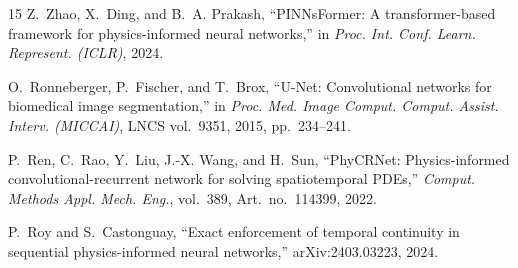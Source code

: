 \documentclass[conference]{IEEEtran}
\begin{document}
\begin{thebibliography}{15}
Z.~Zhao, X.~Ding, and B.~A. Prakash, ``PINNsFormer: A transformer-based
framework for physics-informed neural networks,'' in \emph{Proc. Int. Conf.
Learn. Represent. (ICLR)}, 2024.

O.~Ronneberger, P.~Fischer, and T.~Brox, ``U-Net: Convolutional networks for
biomedical image segmentation,'' in \emph{Proc. Med. Image Comput. Comput.
Assist. Interv. (MICCAI)}, LNCS vol.~9351, 2015, pp.~234--241.

P.~Ren, C.~Rao, Y.~Liu, J.-X. Wang, and H.~Sun, ``PhyCRNet:
Physics-informed convolutional-recurrent network for solving spatiotemporal
PDEs,'' \emph{Comput. Methods Appl. Mech. Eng.}, vol.~389, Art.~no.~114399,
2022.

P.~Roy and S.~Castonguay, ``Exact enforcement of temporal continuity in
sequential physics-informed neural networks,'' arXiv:2403.03223, 2024.

\end{thebibliography}
\end{document}
